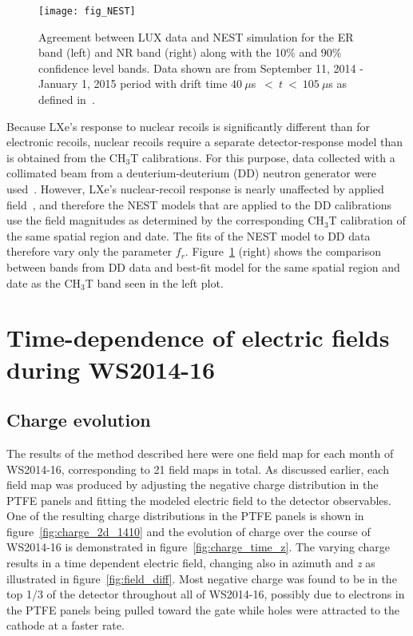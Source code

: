\documentclass[11pt,a4paper]{article}
\begin{document}
\begin{figure}[hb!]
\begin{center}
\texttt{[image: fig\_NEST]}
\caption{Agreement between LUX data and NEST simulation for the ER band (left) and NR band (right) along with the 10\% and 90\% confidence level bands. Data shown are from September 11, 2014 - January 1, 2015 period with drift time $40~\mu$s~$ <~t~<~105~\mu$s as defined in~\cite{Akerib:2016vxi}.}
\label{fig:NEST}
\end{center} 
\end{figure}

Because LXe's response to nuclear recoils is significantly different than for electronic recoils, nuclear recoils require a separate detector-response model than is obtained from the CH$_3$T calibrations. For this purpose, data collected with a collimated beam from a deuterium-deuterium (DD) neutron generator were used~\cite{Akerib:2016mzi}. However, LXe's nuclear-recoil response is nearly unaffected by applied field~\cite{Aprile:2006kx}, and therefore the NEST models that are applied to the DD calibrations use the field magnitudes as determined by the corresponding CH$_3$T calibration of the same spatial region and date. The fits of the NEST model to DD data therefore vary only the parameter $f_r$. Figure~\ref{fig:NEST} (right) shows the comparison between bands from DD data and best-fit model for the same spatial region and date as the CH$_3$T band seen in the left plot.


\section{Time-dependence of electric fields during WS2014-16}

\subsection{Charge evolution}\label{sub:charge_evolution}

The results of the method described here were one field map for each month of WS2014-16, corresponding to 21 field maps in total. As discussed earlier, each field map was produced by adjusting the negative charge distribution in the PTFE panels and fitting the modeled electric field to the detector observables. One of the resulting charge distributions in the PTFE panels is shown in figure~\ref{fig:charge_2d_1410} and the evolution of charge over the course of WS2014-16 is demonstrated in figure~\ref{fig:charge_time_z}. The varying charge results in a time dependent electric field, changing also in azimuth and \textit{z} as illustrated in figure~\ref{fig:field_diff}. Most negative charge was found to be in the top 1/3 of the detector throughout all of WS2014-16, possibly due to electrons in the PTFE panels being pulled toward the gate while holes were attracted to the cathode at a faster rate. 
\end{document}

